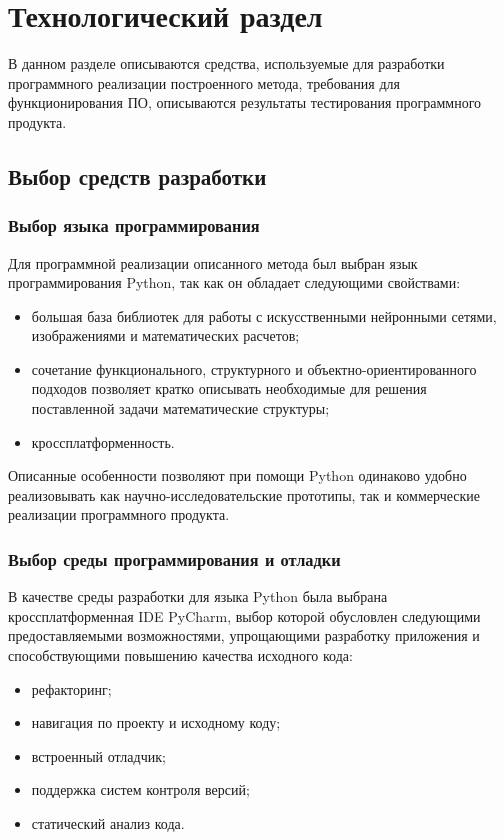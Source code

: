 \chapter{Технологический раздел}
\label{cha:impl}

В данном разделе описываются средства, используемые для разработки программного реализации построенного метода, требования для функционирования ПО, описываются результаты тестирования программного продукта.

\section{Выбор средств разработки}

\subsection{Выбор языка программирования}

Для программной реализации описанного метода был выбран язык программирования Python, так как он обладает следующими свойствами:

\begin{itemize}
	\item большая база библиотек для работы с искусственными нейронными сетями, изображениями и математических расчетов;
	\item сочетание функционального, структурного и объектно-ориентированного подходов позволяет кратко описывать необходимые для решения поставленной задачи математические структуры;
	\item кроссплатформенность.
\end{itemize}

Описанные особенности позволяют при помощи Python одинаково удобно реализовывать как научно-исследовательские прототипы, так и коммерческие реализации программного продукта.

\subsection{Выбор среды программирования и отладки}

В качестве среды разработки для языка Python была выбрана кроссплатформенная IDE PyCharm, выбор которой обусловлен следующими предоставляемыми возможностями, упрощающими разработку приложения и способствующими повышению качества исходного кода:

\begin{itemize}
	\item рефакторинг;
	\item навигация по проекту и исходному коду;
	\item встроенный отладчик;
	\item поддержка систем контроля версий;
	\item статический анализ кода.
\end{itemize}

